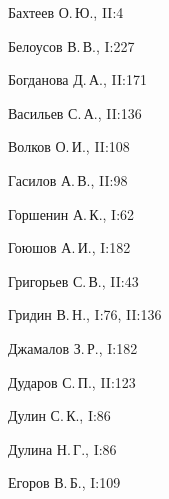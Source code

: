 \begin{theindex}
  \item Бахтеев О.\,Ю., II:4


  \item Белоусов В.\,В., I:227


  \item Богданова Д.\,А., II:171





  \indexspace





  \item Васильев С.\,А., II:136


  \item Волков О.\,И., II:108





  \indexspace





  \item Гасилов А.\,В., II:98


  \item Горшенин А.\,К., I:62


  \item Гоюшов  А.\,И., I:182


  \item Григорьев С.\,В., II:43


  \item Гридин В.\,Н., I:76, II:136





  \indexspace





  \item Джамалов  З.\,Р., I:182


  \item Дударов С.\,П., II:123


  \item Дулин С.\,К., I:86


  \item Дулина Н.\,Г., I:86





  \indexspace





  \item Егоров В.\,Б., I:109






\end{theindex}

